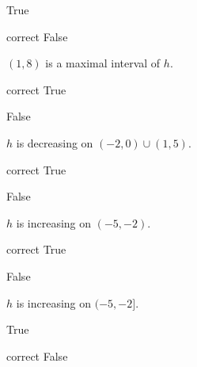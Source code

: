 \documentclass{ximera}
\begin{document}
\begin{exercise}
\begin{question}
\begin{multipleChoice}
\item {True}
\item [correct]{False}
\end{multipleChoice}

\end{question}





\begin{question}
$(1,8)$ is a maximal interval of $h$.

\begin{multipleChoice}
\item [correct]{True}
\item {False}
\end{multipleChoice}

\end{question}








\begin{question}
$h$ is decreasing on $(-2,0) \cup (1,5)$.

\begin{multipleChoice}
\item [correct]{True}
\item {False}
\end{multipleChoice}

\end{question}







\begin{question}
$h$ is increasing on $(-5,-2)$.

\begin{multipleChoice}
\item [correct]{True}
\item {False}
\end{multipleChoice}

\end{question}






\begin{question}
$h$ is increasing on $(-5,-2]$.

\begin{multipleChoice}
\item {True}
\item [correct]{False}
\end{multipleChoice}

\end{question}










\end{exercise}
\end{document}

